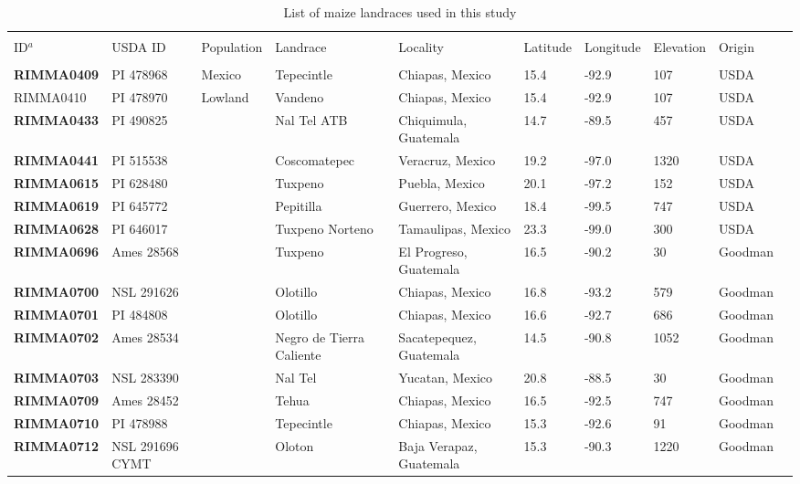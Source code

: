 \begin{table}[h]
    \begin{center}
    \caption[]{List of maize landraces used in this study\hspace*{7.5cm}}  
{\fontsize{7}{10}\selectfont
    \begin{tabular}{llllllllll}
        \hline\hline
       & & & \\[-4mm] 
	 ID$^a$	&	USDA ID	&	Population	&	Landrace	&	Locality	&	Latitude	&	Longitude	&	Elevation	&	Origin	\\[0.0cm]
	\hline 
	& & & \\[-4mm] 
{\bf RIMMA0409}	&	PI 478968	&	Mexico 	&	Tepecintle	&	Chiapas, Mexico	&	15.4 	&	-92.9 	&	107	&	USDA	\\
RIMMA0410	&	PI 478970	&	Lowland	&	Vandeno	&	Chiapas, Mexico	&	15.4 	&	-92.9 	&	107	&	USDA	\\
{\bf RIMMA0433}	&	PI 490825	&		&	Nal Tel ATB	&	Chiquimula, Guatemala	&	14.7 	&	-89.5 	&	457	&	USDA	\\
{\bf RIMMA0441}	&	PI 515538	&		&	Coscomatepec	&	Veracruz, Mexico	&	19.2 	&	-97.0 	&	1320	&	USDA	\\
{\bf RIMMA0615}	&	PI 628480	&		&	Tuxpeno	&	Puebla, Mexico	&	20.1 	&	-97.2 	&	152	&	USDA	\\
{\bf RIMMA0619}	&	PI 645772	&		&	Pepitilla	&	Guerrero, Mexico	&	18.4 	&	-99.5 	&	747	&	USDA	\\
{\bf RIMMA0628}	&	PI 646017	&		&	Tuxpeno Norteno	&	Tamaulipas, Mexico	&	23.3 	&	-99.0 	&	300	&	USDA	\\
{\bf RIMMA0696}	&	Ames 28568	&		&	Tuxpeno	&	El Progreso, Guatemala	&	16.5 	&	-90.2 	&	30	&	Goodman	\\
{\bf RIMMA0700}	&	NSL 291626	&		&	Olotillo	&	Chiapas, Mexico	&	16.8 	&	-93.2 	&	579	&	Goodman	\\
{\bf RIMMA0701}	&	PI 484808	&		&	Olotillo	&	Chiapas, Mexico	&	16.6 	&	-92.7 	&	686	&	Goodman	\\
{\bf RIMMA0702}	&	Ames 28534	&		&	Negro de Tierra Caliente	&	Sacatepequez, Guatemala	&	14.5 	&	-90.8 	&	1052	&	Goodman	\\
{\bf RIMMA0703}	&	NSL 283390	&		&	Nal Tel	&	Yucatan, Mexico	&	20.8 	&	-88.5 	&	30	&	Goodman	\\
{\bf RIMMA0709}	&	Ames 28452	&		&	Tehua	&	Chiapas, Mexico	&	16.5 	&	-92.5 	&	747	&	Goodman	\\
{\bf RIMMA0710}	&	PI 478988	&		&	Tepecintle	&	Chiapas, Mexico	&	15.3 	&	-92.6 	&	91	&	Goodman	\\
{\bf RIMMA0712}	&	NSL 291696 CYMT	&		&	Oloton	&	Baja Verapaz, Guatemala	&	15.3 	&	-90.3 	&	1220	&	Goodman	\\

\end{tabular}}
\end{center}
\end{table}
